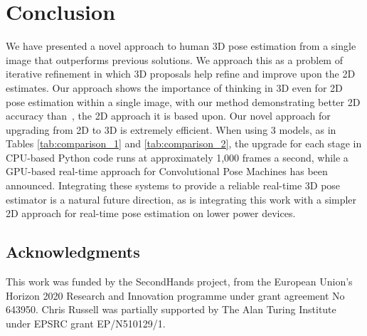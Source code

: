 \documentclass[10pt,twocolumn,letterpaper]{article}
\begin{document}
\section{Conclusion}
We have presented a novel approach to human 3D pose estimation from a
single image that outperforms previous solutions. We approach this as
a problem of iterative refinement in which 3D proposals help refine
and improve upon the 2D estimates.
%
Our approach shows the importance of thinking in 3D even for 2D pose
estimation within a single image, with our method 
demonstrating better 2D accuracy than~\cite{wei2016convolutional}, the 2D approach it is
based upon. 
Our novel approach for upgrading from 2D to 3D is extremely efficient. When
using 3 models, as in Tables \ref{tab:comparison_1} and \ref{tab:comparison_2},
the upgrade for each stage in CPU-based Python code runs at approximately 1,000
frames a second, while a GPU-based real-time approach for Convolutional Pose
Machines has been announced. Integrating these systems to provide a reliable
real-time 3D pose estimator is a natural future direction, as is integrating
this work with a simpler 2D approach for real-time pose estimation on lower
power devices.

\subsection*{Acknowledgments}
This work was funded by the SecondHands project, from
the European Union's Horizon 2020 Research and Innovation programme
under grant agreement No 643950.   Chris Russell was partially
supported by The Alan Turing Institute under  EPSRC grant
EP/N510129/1.

{\small
    }



\end{document}
